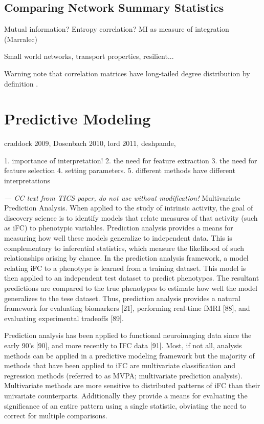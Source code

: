 \documentclass[5p]{elsarticle}
\begin{document}

\subsection{Comparing Network Summary Statistics}

Mutual information? Entropy correlation? MI as measure of integration (Marralec)

Small world networks, transport properties, resilient...
\cite{achard2006,bullmore2009}

Warning note that correlation matrices have long-tailed degree
distribution by definition \cite{zalesky2012}.


\section{Predictive Modeling}
craddock 2009, Dosenbach 2010, lord 2011, deshpande, 

1. importance of interpretation!
2. the need for feature extraction
3. the need for feature selection
4. setting parameters.
5. different methods have different interpretations

\emph{ --- CC text from TICS paper, do not use without modification!}
Multivariate Prediction Analysis. When applied to the study of intrinsic activity, the goal of discovery
science is to identify models that relate measures of that activity (such as iFC) to phenotypic variables.
Prediction analysis provides a means for measuring how well these models generalize to independent data.
This is complementary to inferential statistics, which measure the likelihood of such relationships
arising by chance. In the prediction analysis framework, a model relating iFC to a phenotype is learned 
from a training dataset. This model is then applied to an independent test dataset to predict phenotypes.
The resultant predictions are compared to the true phenotypes to estimate how well the model generalizes
to the tese dataset. Thus, prediction analysis provides a natural framework for evaluating biomarkers [21],
performing real-time fMRI [88], and evaluating experimental tradeoffs [89]. 

Prediction analysis has been applied to functional neuroimaging data since the early 90’s [90], and more
recently to IFC data [91]. Most, if not all, analysis methods can be applied in a predictive modeling
framework but the majority of methods that have been applied to iFC are multivariate classification and
regression methods (referred to as MVPA; multivariate prediction analysis). Multivariate methods are more
sensitive to distributed patterns of iFC than their univariate counterparts. Additionally they provide a
means for evaluating the significance of an entire pattern using a single statistic, obviating the need
to correct for multiple comparisons. 
\end{document}
